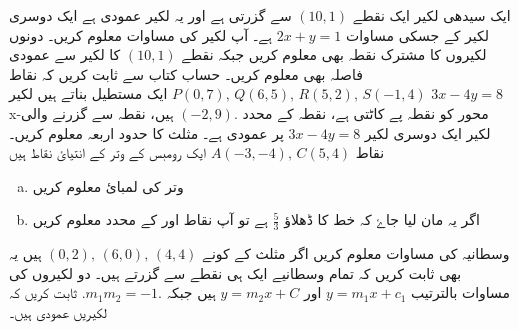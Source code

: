 ایک سیدھی لکیر   ایک نقطے \( (10,1) \)  سے گزرتی ہے اور یہ لکیر عمودی ہے ایک دوسری لکیر  کے جسکی مساوات \( 2x+y=1 \) ہے۔ آپ لکیر  کی مساوات معلوم کریں۔
دونوں لکیروں کا مشترک نقطہ بھی معلوم کریں جبکہ نقطے \( (10,1) \)  کا لکیر  سے عمودی فاصلہ بھی معلوم کریں۔
حساب کتاب سے ثابت کریں کہ نقاط \( P(0,7), \, Q(6,5),\, R(5,2), \, S(-1,4) \) ایک مستطیل بناتے ہیں
لکیر \( 3x-4y=8 \) x-محور کو نقطہ  پے کاٹتی ہے، نقطہ کے محدد    \( (-2,9). \) ہیں، نقطہ  سے گزرنے والی لکیر ایک دوسری لکیر  \( 3x-4y=8 \) پر عمودی ہے۔ مثلث  کا حدود اربعہ معلوم کریں۔
نقاط \( A(-3,-4) , \, C(5,4) \) ایک رومبس  کے وتر کے انتیائ نقاط ہیں
\begin{multicols}{2}
\begin{enumerate}[a.]
\item
وتر  کی لمبائ معلوم کریں 
\item
اگر یہ مان لیا جاۓ کہ خط  کا ڈھلاؤ  \( \frac{5}{3} \) ہے تو آپ نقاط  اور  کے محدد معلوم کریں
\end{enumerate}
\end{multicols}
وسطانیہ کی مساوات معلوم کریں اگر مثلث کے کونے \( (0,2), \, (6,0), \, (4,4) \) ہیں یہ بھی ثابت کریں کہ تمام وسطانیے ایک ہی نقطے سے گزرتے ہیں۔
دو لکیروں کی مساوات بالترتیب \( y=m_1x +c_1  \) اور  \(y=m_2x + C    \) ہیں جبکہ \(m_{1}m_{2}=-1. \). ثابت کریں کہ لکیریں عمودی ہیں۔ 

